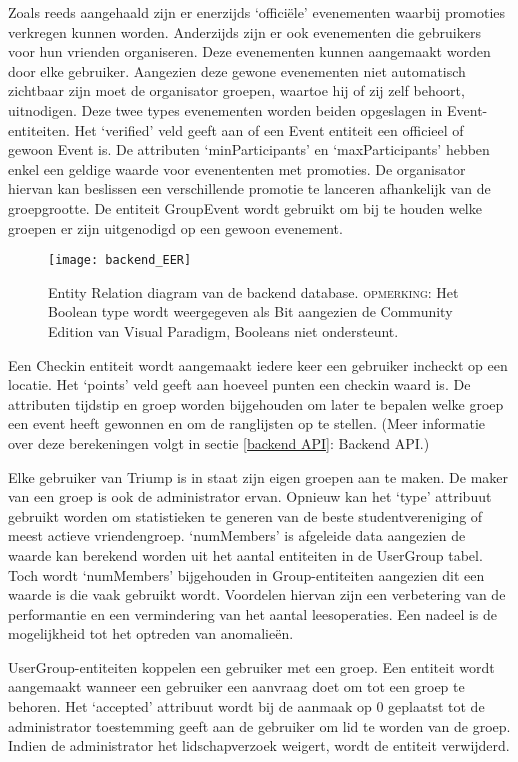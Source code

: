 Zoals reeds aangehaald zijn er enerzijds `officiële' evenementen waarbij promoties verkregen kunnen worden. Anderzijds zijn er ook evenementen die gebruikers voor hun vrienden organiseren. Deze evenementen kunnen aangemaakt worden door elke gebruiker. Aangezien deze gewone evenementen niet automatisch zichtbaar zijn moet de organisator groepen, waartoe hij of zij zelf behoort, uitnodigen. 
Deze twee types evenementen worden beiden opgeslagen in Event-entiteiten. Het `verified' veld geeft aan of een Event entiteit een officieel of gewoon Event is. De attributen `minParticipants' en `maxParticipants' hebben enkel een geldige waarde voor evenententen met promoties. De organisator hiervan kan beslissen een verschillende promotie te lanceren afhankelijk van de groepgrootte. De entiteit GroupEvent wordt gebruikt om bij te houden welke groepen er zijn uitgenodigd op een gewoon evenement.


\begin{figure}[H]
	\texttt{[image: backend\_EER]}
	\caption{Entity Relation diagram van de backend database. \textsc{opmerking}: Het Boolean type wordt weergegeven als Bit aangezien de Community Edition van Visual Paradigm, Booleans niet ondersteunt. }
	\label{fig:Backend ER}
\end{figure}


Een Checkin entiteit wordt aangemaakt iedere keer een gebruiker incheckt op een locatie. Het `points' veld geeft aan hoeveel punten een checkin waard is. De attributen tijdstip en groep worden bijgehouden om later te bepalen welke groep een event heeft gewonnen en om de ranglijsten op te stellen. (Meer informatie over deze berekeningen volgt in sectie \ref{backend API}: Backend API.)

Elke gebruiker van Triump is in staat zijn eigen groepen aan te maken. De maker van een groep is ook de administrator ervan. Opnieuw kan het `type' attribuut gebruikt worden om statistieken te generen van de beste studentvereniging of meest actieve vriendengroep. `numMembers' is afgeleide data aangezien de waarde kan berekend worden uit het aantal entiteiten in de UserGroup tabel. Toch wordt `numMembers' bijgehouden in Group-entiteiten aangezien dit een waarde is die vaak gebruikt wordt. Voordelen hiervan zijn een verbetering van de performantie en een vermindering van het aantal leesoperaties. Een nadeel is de mogelijkheid tot het optreden van anomalieën.

UserGroup-entiteiten koppelen een gebruiker met een groep. Een entiteit wordt aangemaakt wanneer een gebruiker een aanvraag doet om tot een groep te behoren. Het `accepted' attribuut wordt bij de aanmaak op 0 geplaatst tot de administrator toestemming geeft aan de gebruiker om lid te worden van de groep. Indien de administrator het lidschapverzoek weigert, wordt de entiteit verwijderd.

